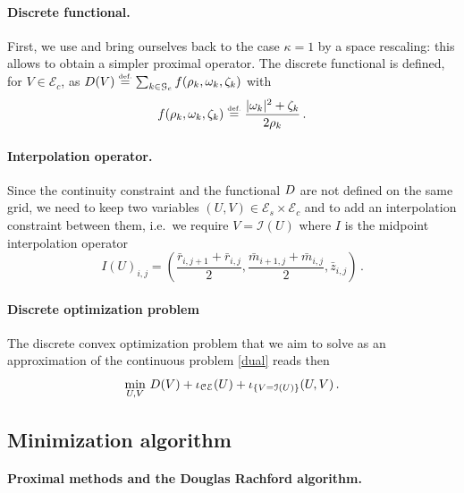 \paragraph{Discrete functional.}

First, we use  and bring ourselves back to the case $\kappa = 1$ by a space rescaling: this allows to obtain a simpler proximal operator. The discrete functional is defined, for $V \in \mathcal{E}_c$, as $D(V) \stackrel{\mbox{\upshape\tiny def.}}{=} \sum_{k\in\mathcal{G}_c } f(\rho_k,\omega_k,\zeta_k)$ with 
\[
f(\rho_k,\omega_k,\zeta_k) \stackrel{\mbox{\upshape\tiny def.}}{=} \frac{|\omega_k|^2 + \zeta_k}{2\rho_k} \, .
\]

\paragraph{Interpolation operator.}
Since the continuity constraint and the functional $D$ are not defined on the same grid, we need to keep two variables $(U,V)\in \mathcal{E}_s \times \mathcal{E}_c$ and to add an interpolation constraint between them, i.e.\ we require $V=\mathcal{I}(U)$ where $I$ is the midpoint interpolation operator 
\[
I(U)_{i,j} = \left( \frac{\bar{r}_{i,j+1}+\bar{r}_{i,j}}{2},\frac{\bar{m}_{i+1,j}+\bar{m}_{i,j}}{2},\bar{z}_{i,j} \right) \, .
\]


\paragraph{Discrete optimization problem}
The discrete convex optimization problem that we aim to solve as an approximation of the continuous problem \eqref{dual} reads then
\begin{equation*}
\min_{U,V} \,  D(V) + \iota_{\mathcal{CE}}(U) + \iota_{\{V=\mathcal{I}(U)\}} (U,V) \, .
\end{equation*}

\subsection{Minimization algorithm}

\paragraph{Proximal methods and the Douglas Rachford algorithm.}

